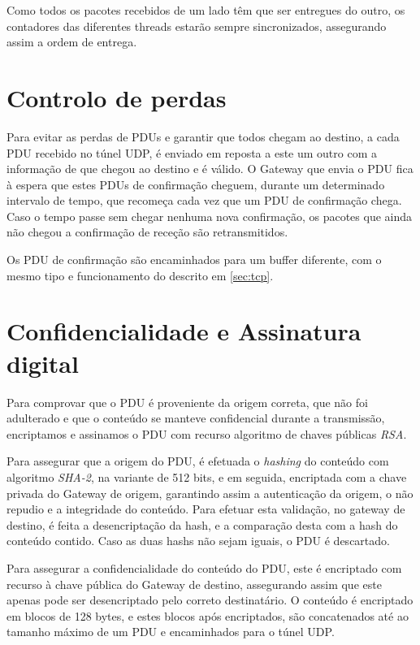 \documentclass[a4paper]{report}
\begin{document}
Como todos os pacotes recebidos de um lado têm que ser entregues do outro,
os contadores das diferentes threads estarão sempre sincronizados, assegurando
assim a ordem de entrega.

\section{Controlo de perdas}

Para evitar as perdas de PDUs e garantir que todos chegam ao destino, a cada 
PDU recebido no túnel UDP, é enviado em reposta a este um outro com a
informação de que chegou ao destino e é válido. O Gateway que envia o PDU
fica à espera que estes PDUs de confirmação cheguem, durante um determinado
intervalo de tempo, que recomeça cada vez que um PDU de confirmação chega.
Caso o tempo passe sem chegar nenhuma nova confirmação, os pacotes que ainda
não chegou a confirmação de receção são retransmitidos.

Os PDU de confirmação são encaminhados para um buffer diferente, com o mesmo
tipo e funcionamento do descrito em \ref{sec:tcp}.

\section{Confidencialidade e Assinatura digital} \label{sec:auth}

Para comprovar que o PDU é proveniente da origem correta, que não foi
adulterado e que o conteúdo se manteve confidencial durante a transmissão,
encriptamos e assinamos o PDU com recurso algoritmo de chaves públicas 
\textit{RSA}. 

Para assegurar que a origem do PDU, é efetuada o \textit{hashing} do conteúdo
com algoritmo \textit{SHA-2}, na variante de 512 bits, e em seguida, encriptada
com a chave privada do Gateway de origem, garantindo assim a autenticação da
origem, o não repudio e a integridade do conteúdo. Para efetuar esta validação,
no gateway de destino, é feita a desencriptação da hash, e a comparação desta 
com a hash do conteúdo contido. Caso as duas hashs não sejam iguais, o PDU é
descartado.

Para assegurar a confidencialidade do conteúdo do PDU, este é encriptado com
recurso à chave pública do Gateway de destino, assegurando assim que este
apenas pode ser desencriptado pelo correto destinatário. O conteúdo é 
encriptado em blocos de 128 bytes, e estes blocos após encriptados, são
concatenados até ao tamanho máximo de um PDU e encaminhados para o túnel
UDP.
\end{document}
